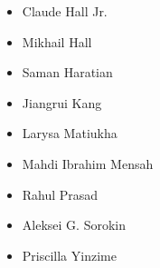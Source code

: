\begin{itemize}
	\item Claude Hall Jr.
	\item Mikhail Hall
	\item Saman Haratian
	\item Jiangrui Kang
	\item Larysa Matiukha
	\item Mahdi Ibrahim Mensah
	\item Rahul Prasad
	\item Aleksei G. Sorokin
	\item Priscilla Yinzime
\end{itemize}